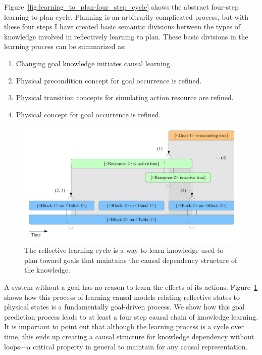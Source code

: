 Figure~\ref{fig:learning_to_plan-four_step_cycle} shows the abstract
four-step learning to plan cycle.  Planning is an arbitrarily
complicated process, but with these four steps I have created basic
semantic divisions between the types of knowledge involved in
reflectively learning to plan.  These basic divisions in the learning
process can be summarized as:

\begin{enumerate}
\item{Changing goal knowledge initiates causal learning.}
\item{Physical precondition concept for goal occurrence is refined.}
\item{Physical transition concepts for simulating action resource are refined.}
\item{Physical concept for goal occurrence is refined.}
\end{enumerate}

\begin{figure}[bth]
  \center
  \includegraphics[width=12cm]{gfx/learning_to_plan}
  \caption[The reflective learning cycle]{The reflective learning
    cycle is a way to learn knowledge used to plan toward goals that
    maintains the causal dependency structure of the knowledge.}
  \label{fig:learning_to_plan}
\end{figure}

A system without a goal has no reason to learn the effects of its
actions.  Figure~\ref{fig:learning_to_plan} shows how this process of
learning causal models relating reflective states to physical states
is a fundamentally goal-driven process.  We show how this goal
prediction process leads to at least a four step causal chain of
knowledge learning.  It is important to point out that although the
learning process is a cycle over time, this ends up creating a causal
structure for knowledge dependency without loops---a critical property
in general to maintain for any causal representation.

